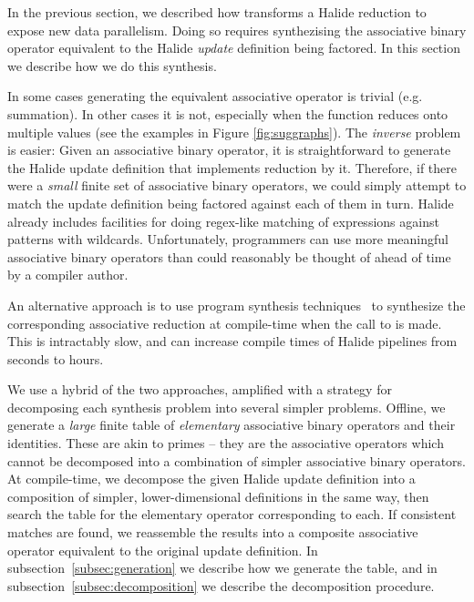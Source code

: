 In the previous section, we described how  transforms a Halide reduction to expose new data parallelism. Doing so requires synthezising the associative binary operator equivalent to the Halide \emph{update} definition being factored. In this section we describe how we do this synthesis.

In some cases generating the equivalent associative operator is trivial (e.g. summation). In other cases it is not, especially when the function reduces onto multiple values (see the examples in Figure \ref{fig:suggraphs}). The \emph{inverse} problem is easier: Given an associative binary operator, it is straightforward to generate the Halide update definition that implements reduction by it. Therefore, if there were a \emph{small} finite set of associative binary operators, we could simply attempt to match the update definition being factored against each of them in turn. Halide already includes facilities for doing regex-like matching of expressions against patterns with wildcards. Unfortunately, programmers can use more meaningful associative binary operators than could reasonably be thought of ahead of time by a compiler author.

An alternative approach is to use program synthesis techniques~\cite{Solar-Lezama:2008:PSS:1714168, Torlak:2013:GSL:2509578.2509586} to synthesize the corresponding associative reduction at compile-time when the call to  is made. This is intractably slow, and can increase compile times of Halide pipelines from seconds to hours.

We use a hybrid of the two approaches, amplified with a strategy for decomposing each synthesis problem into several simpler problems. Offline, we generate a \emph{large} finite table of \emph{elementary} associative binary operators and their identities. These are akin to primes -- they are the associative operators which cannot be decomposed into a combination of simpler associative binary operators. At compile-time, we decompose the given Halide update definition into a composition of simpler, lower-dimensional definitions in the same way, then search the table for the elementary operator corresponding to each. If consistent matches are found, we reassemble the results into a composite associative operator equivalent to the original update definition. In subsection~\ref{subsec:generation} we describe how we generate the table, and in subsection~\ref{subsec:decomposition} we describe the decomposition procedure.

